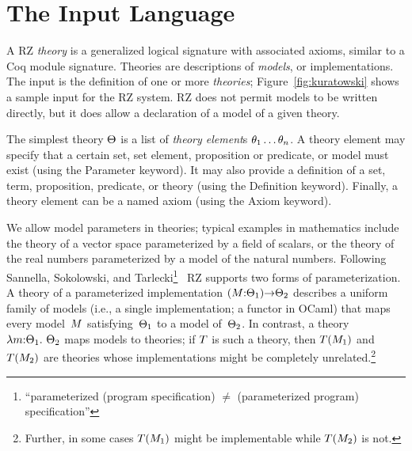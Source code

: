 
\section{The Input Language}
\label{sec:input-language}

A RZ \emph{theory} is a generalized logical signature with associated
axioms, similar to a Coq module signature. Theories are descriptions
of \emph{models}, or implementations. The input is the definition of
one or more \emph{theories}; Figure~\ref{fig:kuratowski} shows a
sample input for the RZ system. RZ does not permit models to be
written directly, but it does allow a declaration of a model of a
given theory.

The simplest theory $\Theta$ is a list of \emph{theory element}\/s
$\theta_1 \ldots \theta_n$. A theory element may specify that a certain
set, set element, proposition or predicate, or model must exist (using
the 
\textsf{Parameter} keyword). It may also provide a definition
of a set, term, proposition, predicate, or theory (using the 
\textsf{Definition} keyword). Finally, a theory element can be
a named axiom (using the \textsf{Axiom} keyword).

We allow model parameters in theories; 
typical examples in mathematics include
the theory of a vector space parameterized by a field of scalars,
or the theory of the real numbers parameterized by a model of the
natural numbers.
Following Sannella, Sokolowski, and 
Tarlecki\footnote{``parameterized (program specification) $\neq$ (parameterized program) specification''}~\cite{sannella92:_towar} RZ supports two forms of parameterization.  A theory of a parameterized implementation
$(M{:}\Theta_1){\to}\Theta_2$ describes a uniform family of models (i.e.,
a single implementation; a functor in OCaml) that maps every
model~$M$ satisfying~$\Theta_1$ to a model of~$\Theta_2$.  In contrast,
a theory $\lambda m{:}\Theta_1.\ \Theta_2$
maps models to theories; if $T$ is such a theory, then
$T(M_1)$ and $T(M_2)$ are theories whose implementations might be completely unrelated.\footnote{
Further, in some cases $T(M_1)$ might be implementable while $T(M_2)$ is not.
}

